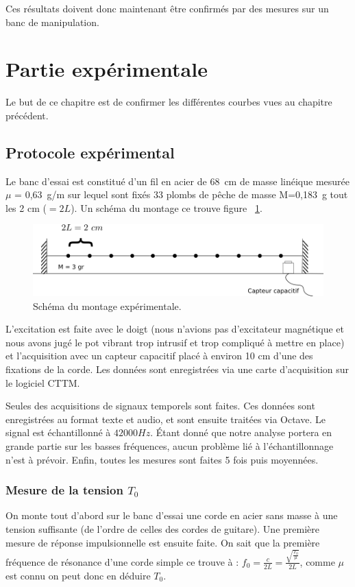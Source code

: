 \documentclass[a4paper,11pt]{report} %
\begin{document}
\bigskip
Ces résultats doivent donc maintenant être confirmés par des mesures sur un banc de manipulation.
\newpage
\section{Partie expérimentale}
Le but de ce chapitre est de confirmer les différentes courbes vues au chapitre précédent.


\subsection{Protocole expérimental}
Le banc d'essai est constitué d'un fil en acier de 68~cm de masse linéique mesurée $\mu$ = 0,63~g/m sur lequel sont fixés 33 plombs de pêche de masse M=0,183~g tout les 2 cm ($=2L$). Un schéma du montage ce trouve figure ~\ref{schema_cordel}.

\begin{figure}[!h]\centering
\includegraphics[scale=0.6]{./figures/schema_cordel_sans_tension.png}
\caption{Schéma du montage expérimentale.}
\label{schema_cordel}
\end{figure}

\bigskip
L'excitation est faite avec le doigt (nous n'avions pas d'excitateur magnétique et nous avons jugé le pot vibrant trop intrusif et trop compliqué à mettre en place) et l'acquisition avec un capteur capacitif placé à environ 10 cm d'une des fixations de la corde. Les données sont enregistrées via une carte d'acquisition sur le logiciel CTTM.

Seules des acquisitions de signaux temporels sont faites. Ces données sont enregistrées au format texte et audio, et sont ensuite traitées via Octave. Le signal est échantillonné à $42 000 Hz$. Étant donné que notre analyse portera en grande partie sur les basses fréquences, aucun problème lié à l'échantillonnage n'est à prévoir.
Enfin, toutes les mesures sont faites 5 fois puis moyennées.

\subsubsection{Mesure de la tension $T_0$}
On monte tout d'abord sur le banc d'essai une corde en acier sans masse à une tension suffisante (de l'ordre de celles des cordes de guitare). Une première mesure de réponse impulsionnelle est ensuite faite. On sait que la première fréquence de résonance d'une corde simple ce trouve à : $f_0 =\frac{c}{2L} = \frac{\sqrt{\frac{T_0}{\mu}}}{2L}$, comme $\mu$ est connu on peut donc en déduire $T_0$.
\end{document}
